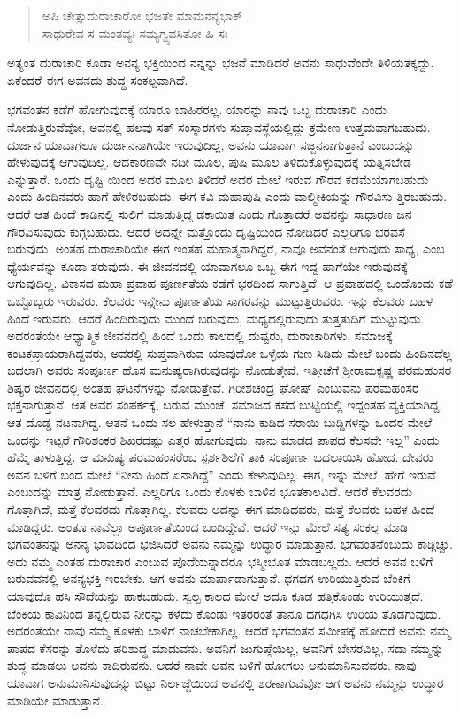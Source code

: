 \begin{verse}
ಅಪಿ ಚೇತ್ಸುದುರಾಚಾರೋ ಭಜತೇ ಮಾಮನನ್ಯಭಾಕ್ ।\\ಸಾಧುರೇವ ಸ ಮಂತವ್ಯಃ ಸಮ್ಯಗ್ವ್ಯವಸಿತೋ ಹಿ ಸಃ 
\end{verse}

{\small ಅತ್ಯಂತ ದುರಾಚಾರಿ ಕೂಡಾ ಅನನ್ಯ ಭಕ್ತಿಯಿಂದ ನನ್ನನ್ನು ಭಜನೆ ಮಾಡಿದರೆ ಅವನು ಸಾಧುವೆಂದೇ ತಿಳಿಯತಕ್ಕದ್ದು. ಏಕೆಂದರೆ ಈಗ ಅವನದು ಶುದ್ಧ ಸಂಕಲ್ಪವಾಗಿದೆ.}

ಭಗವಂತನ ಕಡೆಗೆ ಹೋಗುವುದಕ್ಕೆ ಯಾರೂ ಬಾಹಿರರಲ್ಲ. ಯಾರನ್ನು ನಾವು ಒಬ್ಬ ದುರಾಚಾರಿ ಎಂದು ನೋಡುತ್ತಿರುವೆವೋ, ಅವನಲ್ಲಿ ಹಲವು ಸತ್ ಸಂಸ್ಕಾರಗಳು ಸುಪ್ತಾವಸ್ಥೆಯಲ್ಲಿದ್ದು ಕ್ರಮೇಣ ಉತ್ತಮವಾಗಬಹುದು. ದುರ್ಜನ ಯಾವಾಗಲೂ ದುರ್ಜನನಾಗಿಯೇ ಇರುವುದಿಲ್ಲ, ಅವನು ಯಾವಾಗ ಸಜ್ಜನನಾಗುತ್ತಾನೆ ಎಂಬುದನ್ನು ಹೇಳುವುದಕ್ಕೆ ಆಗುವುದಿಲ್ಲ. ಆದಕಾರಣವೇ ನದೀ ಮೂಲ, ಪುಷಿ ಮೂಲ ತಿಳಿದುಕೊಳ್ಳುವುದಕ್ಕೆ ಯತ್ನಿಸಬೇಡ ಎನ್ನುತ್ತಾರೆ. ಒಂದು ದೃಷ್ಟಿ ಯಿಂದ ಅದರ ಮೂಲ ತಿಳಿದರೆ ಅದರ ಮೇಲೆ ಇರುವ ಗೌರವ ಕಡಮೆಯಾಗಬಹುದು ಎಂದು ಹಿಂದಿನವರು ಹಾಗೆ ಹೇಳಿರಬಹುದು. ಈಗ ಕವಿ ಮಹಾಪುಷಿ ಎಂದು ವಾಲ್ಮೀಕಿಯನ್ನು ಗೌರವಿಸು ತ್ತಿರಬಹುದು. ಆದರೆ ಆತ ಹಿಂದೆ ಕಾಡಿನಲ್ಲಿ ಸುಲಿಗೆ ಮಾಡುತ್ತಿದ್ದ ಡಕಾಯಿತ ಎಂದು ಗೊತ್ತಾದರೆ ಅವನನ್ನು ಸಾಧಾರಣ ಜನ ಗೌರವಿಸುವುದು ಕುಗ್ಗಬಹುದು. ಆದರೆ ಅದನ್ನೇ ಮತ್ತೊಂದು ದೃಷ್ಟಿಯಿಂದ ನೋಡಿದರೆ ಎಲ್ಲರಿಗೂ ಭರವಸೆ ಬರುವುದು. ಅಂತಹ ದುರಾಚಾರಿಯೇ ಈಗ ಇಂತಹ ಮಹಾತ್ಮನಾಗಿದ್ದರೆ, ನಾವೂ ಅವನಂತೆ ಆಗುವುದು ಸಾಧ್ಯ, ಎಂಬ ಧ್ಯೆರ್ಯವನ್ನು ಕೂಡಾ ತರುವುದು. ಈ ಜೀವನದಲ್ಲಿ ಯಾವಾಗಲೂ ಒಬ್ಬ ಈಗ ಇದ್ದ ಹಾಗೆಯೇ ಇರುವುದಕ್ಕೆ ಆಗುವುದಿಲ್ಲ. ವಿಕಾಸದ ಮಹಾ ಪ್ರವಾಹ ಪೂರ್ಣತೆಯ ಕಡೆಗೆ ಭರದಿಂದ ಸಾಗುತ್ತಿದೆ. ಆ ಪ್ರವಾಹದಲ್ಲಿ ಒಂದೊಂದು ಕಡೆ ಒಬ್ಬೊಬ್ಬರು ಇರುವರು. ಕೆಲವರು ಇನ್ನೇನು ಪೂರ್ಣತೆಯ ಸಾಗರವನ್ನು ಮುಟ್ಟುತ್ತಿರುವರು. ಇನ್ನು ಕೆಲವರು ಬಹಳ ಹಿಂದೆ ಇರುವರು. ಆದರೆ ಹಿಂದಿರುವುದು ಮುಂದೆ ಬರುವುದು, ಮಧ್ಯದಲ್ಲಿರುವುದು ತುತ್ತತುದಿಗೆ ಮುಟ್ಟುವುದು. ಅದರಂತೆಯೇ ಆಧ್ಯಾತ್ಮಿಕ ಜೀವನದಲ್ಲಿ ಹಿಂದೆ ಒಂದು ಕಾಲದಲ್ಲಿ ದುಷ್ಟರು, ದುರಾಚಾರಿಗಳು, ಸಮಾಜಕ್ಕೆ ಕಂಟಕಪ್ರಾಯರಾಗಿದ್ದವರು, ಅವರಲ್ಲಿ ಸುಪ್ತವಾಗಿರುವ ಯಾವುದೋ ಒಳ್ಳೆಯ ಗುಣ ಸಿಡಿದು ಮೇಲೆ ಬಂದು ಹಿಂದಿನದೆಲ್ಲ ಬದಲಾಗಿ ಅವರು ಸಂಪೂರ್ಣ ಹೊಸ ಮನುಷ್ಯರಾಗಿರುವುದನ್ನು ನೋಡುತ್ತೇವೆ. ಇತ್ತೀಚೆಗೆ ಶ್ರೀರಾಮಕೃಷ್ಣ ಪರಮಹಂಸರ ಶಿಷ್ಯರ ಜೀವನದಲ್ಲಿ ಅಂತಹ ಘಟನೆಗಳನ್ನು ನೋಡುತ್ತೇವೆ. ಗಿರೀಶಚಂದ್ರ ಘೋಷ್ ಎಂಬುವನು ಪರಮಹಂಸರ ಭಕ್ತನಾಗುತ್ತಾನೆ. ಆತ ಅವರ ಸಂಪರ್ಕಕ್ಕೆ, ಬರುವ ಮುಂಚೆ, ಸಮಾಜದ ಕಸದ ಬುಟ್ಟಿಯಲ್ಲಿ ಇದ್ದಂತಹ ವ್ಯಕ್ತಿಯಾಗಿದ್ದ. ಆತ ದೊಡ್ಡ ನಟನಾಗಿದ್ದ. ಆತನೆ ಒಂದು ಸಲ ಹೇಳುತ್ತಾನೆ “ನಾನು ಕುಡಿದ ಸರಾಯಿ ಬುಡ್ಡಿಗಳನ್ನು ಒಂದರ ಮೇಲೆ ಒಂದನ್ನು ಇಟ್ಟರೆ ಗೌರಿಶಂಕರ ಶಿಖರದಷ್ಟು ಎತ್ತರ ಹೋಗುವುದು. ನಾನು ಮಾಡದ ಪಾಪದ ಕೆಲಸವೇ ಇಲ್ಲ” ಎಂದು ಹೆಮ್ಮೆ ತಾಳುತ್ತಿದ್ದ. ಆ ಮನುಷ್ಯ ಪರಮಹಂಸರೆಂಬ ಸ್ಪರ್ಶಶಿಲೆಗೆ ತಾಕಿ ಸಂಪೂರ್ಣ ಬದಲಾಯಿಸಿ ಹೋದ. ದೇವರು ಅವನ ಬಳಿಗೆ ಬಂದ ಮೇಲೆ “ನೀನು ಹಿಂದೆ ಏನಾಗಿದ್ದೆ” ಎಂದು ಕೇಳುವುದಿಲ್ಲ. ಈಗ, ಇನ್ನು ಮೇಲೆ, ಹೇಗೆ ಇರುವೆ ಎಂಬುದನ್ನು ಮಾತ್ರ ನೋಡುತ್ತಾನೆ. ಎಲ್ಲರಿಗೂ ಒಂದು ಕೊಳಕು ಬಾಳಿನ ಭೂತಕಾಲವಿದೆ. ಆದರೆ ಕೆಲವರದು ಗೊತ್ತಾಗಿದೆ, ಮತ್ತೆ ಕೆಲವರದು ಗೊತ್ತಾಗಿಲ್ಲ. ಕೆಲವರು ಅದನ್ನು ಈಗ ಮಾಡಿದವರು, ಮತ್ತೆ ಕೆಲವರು ಬಹಳ ಹಿಂದೆ ಮಾಡಿದ್ದರು. ಅಂತೂ ನಾವೆಲ್ಲಾ ಅಪೂರ್ಣತೆಯಿಂದ ಬಂದಿದ್ದೇವೆ. ಆದರೆ ಇನ್ನು ಮೇಲೆ ಸತ್ಯ ಸಂಕಲ್ಪ ಮಾಡಿ ಭಗವಂತನನ್ನು ಅನನ್ಯ ಭಾವದಿಂದ ಭಜಿಸಿದರೆ ಅವನು ನಮ್ಮನ್ನು ಉದ್ಧಾರ ಮಾಡುತ್ತಾನೆ. ಭಗವಂತನೆಂಬುದು ಕಾಡ್ಗಿಚ್ಚು. ಅದು ನಮ್ಮ ಎಂತಹ ದುರಾಚಾರ ಎಂಬುವ ಪೊದೆಯನ್ನಾದರೂ ಭಸ್ಮೀಭೂತ ಮಾಡಬಲ್ಲದು. ಆದರೆ ಅವನ ಬಳಿಗೆ ಬರುವವನಲ್ಲಿ ಅನನ್ಯಭಕ್ತಿ ಇರಬೇಕು. ಆಗ ಅವನು ಮಾರ್ಪಾಡಾಗುತ್ತಾನೆ. ಧಗಧಗ ಉರಿಯುತ್ತಿರುವ ಬೆಂಕಿಗೆ ಯಾವುದೊ ಹಸಿ ಸೌದೆಯನ್ನು ಹಾಕಬಹುದು. ಸ್ವಲ್ಪ ಕಾಲದ ಮೇಲೆ ಅದೂ ಕೂಡ ಹತ್ತಿಕೊಂಡು ಉರಿಯುತ್ತದೆ. ಬೆಂಕಿಯ ಕಾವಿನಿಂದ ತನ್ನಲ್ಲಿರುವ ನೀರನ್ನು ಕಳೆದು ಕೊಂಡು ಇತರರಂತೆ ತಾನೂ ಧಗಧಗಿಸಿ ಉರಿಯ ತೊಡಗುವುದು. ಅದರಂತೆಯೇ ನಾವು ನಮ್ಮ ಕೊಳಕು ಬಾಳಿಗೆ ನಾಚಬೇಕಾಗಿಲ್ಲ. ಆದರೆ ಭಗವಂತನ ಸಮೀಪಕ್ಕೆ ಹೋದರೆ ಅವನು ನಮ್ಮ ಪಾಪದ ಕೆಸರನ್ನು ತೊಳೆದು ಪರಿಶುದ್ಧ ಮಾಡುವನು. ಅವನಿಗೆ ಜುಗುಪ್ಸೆಯಿಲ್ಲ, ಅವನಿಗೆ ಬೇಸರವಿಲ್ಲ, ಸದಾ ನಮ್ಮನ್ನು ಶುದ್ಧ ಮಾಡಲು ಅವನು ಕಾದಿರುವನು. ಆದರೆ ನಾವೇ ಅವನ ಬಳಿಗೆ ಹೋಗಲು ಅನುಮಾನಿಸುವವರು. ನಾವು ಯಾವಾಗ ಅನುಮಾನಿಸುವುದನ್ನು ಬಿಟ್ಟು ನಿರ್ಲಜ್ಜೆಯಿಂದ ಅವನಲ್ಲಿ ಶರಣಾಗುವೆವೋ ಆಗ ಅವನು ನಮ್ಮನ್ನು ಉದ್ಧಾರ ಮಾಡಿಯೇ ಮಾಡುತ್ತಾನೆ.

